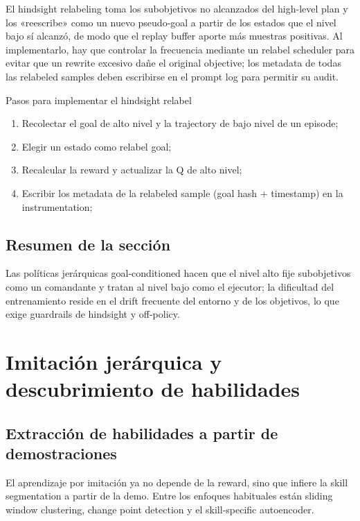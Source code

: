 \documentclass[a4paper]{article}
\begin{document}
El hindsight relabeling toma los subobjetivos no alcanzados del high-level plan y los «reescribe» como un nuevo pseudo-goal a partir de los estados que el nivel bajo sí alcanzó, de modo que el replay buffer aporte más muestras positivas. Al implementarlo, hay que controlar la frecuencia mediante un relabel scheduler para evitar que un rewrite excesivo dañe el original objective; los metadata de todas las relabeled samples deben escribirse en el prompt log para permitir su audit.

\begin{importantbox}{Pasos para implementar el hindsight relabel}
\begin{enumerate}
    \item Recolectar el goal de alto nivel y la trajectory de bajo nivel de un episode;
    \item Elegir un estado como relabel goal;
    \item Recalcular la reward y actualizar la Q de alto nivel;
    \item Escribir los metadata de la relabeled sample (goal hash + timestamp) en la instrumentation;
\end{enumerate}
\end{importantbox}

\subsection{Resumen de la sección}

Las políticas jerárquicas goal-conditioned hacen que el nivel alto fije subobjetivos como un comandante y tratan al nivel bajo como el ejecutor; la dificultad del entrenamiento reside en el drift frecuente del entorno y de los objetivos, lo que exige guardrails de hindsight y off-policy.
\section{Imitación jerárquica y descubrimiento de habilidades}

\subsection{Extracción de habilidades a partir de demostraciones}

El aprendizaje por imitación ya no depende de la reward, sino que infiere la skill segmentation a partir de la demo. Entre los enfoques habituales están sliding window clustering, change point detection y el skill-specific autoencoder.
\end{document}

